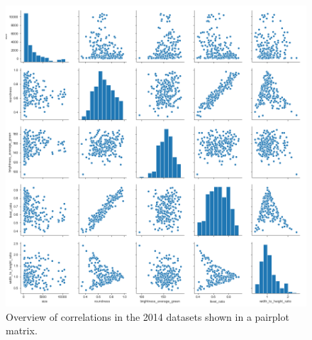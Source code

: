 \documentclass[paper=A4,bibliography=totocnumbered]{scrartcl}
\begin{document}
\begin{figure}
	\centering
	\includegraphics[width=13cm]{pic/overview}
	\caption{Overview of correlations in the 2014 datasets shown in a pairplot matrix.}
	\label{fig:overview}
\end{figure}
\end{document}
